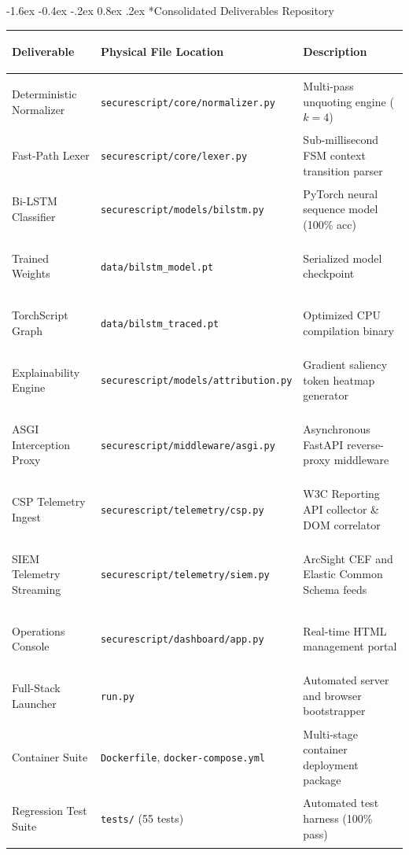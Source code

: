 \documentclass[11pt,a4paper]{article}
\makeatletter
\renewcommand{\section}{\@startsection{section}{1}{\z@}%
  {-1.6ex \@plus -0.4ex \@minus -.2ex}%
  {0.8ex \@plus .2ex}%
  {\normalfont\large\bfseries\color{primaryblue}}}
\makeatother
\begin{document}
\section*{Consolidated Deliverables Repository}
\begin{table}[htbp]
\centering
\footnotesize
\begin{tabularx}{\textwidth}{>{\bfseries\raggedright\arraybackslash}p{3.0cm} >{\raggedright\arraybackslash}p{3.8cm} >{\raggedright\arraybackslash}X}
\toprule
\textbf{Deliverable} & \textbf{Physical File Location} & \textbf{Description} \\
\midrule
Deterministic Normalizer & \texttt{securescript/core/normalizer.py} & Multi-pass unquoting engine ($k=4$) \\
Fast-Path Lexer & \texttt{securescript/core/lexer.py} & Sub-millisecond FSM context transition parser \\
Bi-LSTM Classifier & \texttt{securescript/models/bilstm.py} & PyTorch neural sequence model (100\% acc) \\
Trained Weights & \texttt{data/bilstm\_model.pt} & Serialized model checkpoint \\
TorchScript Graph & \texttt{data/bilstm\_traced.pt} & Optimized CPU compilation binary \\
Explainability Engine & \texttt{securescript/models/attribution.py} & Gradient saliency token heatmap generator \\
ASGI Interception Proxy & \texttt{securescript/middleware/asgi.py} & Asynchronous FastAPI reverse-proxy middleware \\
CSP Telemetry Ingest & \texttt{securescript/telemetry/csp.py} & W3C Reporting API collector \& DOM correlator \\
SIEM Telemetry Streaming & \texttt{securescript/telemetry/siem.py} & ArcSight CEF and Elastic Common Schema feeds \\
Operations Console & \texttt{securescript/dashboard/app.py} & Real-time HTML management portal \\
Full-Stack Launcher & \texttt{run.py} & Automated server and browser bootstrapper \\
Container Suite & \texttt{Dockerfile}, \texttt{docker-compose.yml} & Multi-stage container deployment package \\
Regression Test Suite & \texttt{tests/} (55 tests) & Automated test harness (100\% pass) \\
\bottomrule
\end{tabularx}
\end{table}
\end{document}
